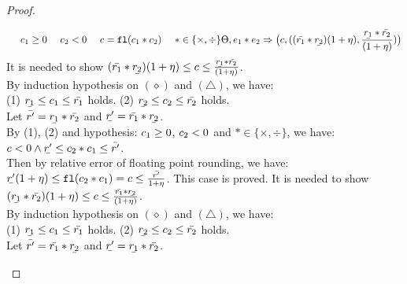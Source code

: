 \documentclass[a4paper,11pt]{article}
\begin{document}
\begin{proof}
\begin{itemize}
{\[{			~~~~
			\fval_1 \geq 0
			~~~~
			\fval_2 < 0
			~~~~
			\fval = \floaten(\fval_1 * \fval_2)
			~~~~
			* \in \{\times, \div \}
		}
		{
		    \trsenv, \expr_1 * \expr_2
		    \trsto
		    \big(
		    \fval,
		    ((\bar{\rval_1} * \ubar{\rval_2})(1 + \eta),
		    \frac{\ubar{\rval_1} * \bar{\rval_2}}{(1 + \eta)})
		    \big)
		}
	\]}
	It is needed to show 
	$(\bar{\rval_1} * \ubar{\rval_2})(1 + \eta)
	\leq \fval \leq 
	\frac{\ubar{\rval_1} * \bar{\rval_2}}{(1 + \eta)}$.\\
	By induction hypothesis on $(\diamond)$ and $(\triangle)$, we have:\\
	(1) $\ubar{\rval_1} \leq \fval_1 \leq \bar{\rval_1}$ holds. 
	(2) $\ubar{\rval_2} \leq \fval_2 \leq \bar{\rval_2}$ holds.\\
	Let $\bar{\rval'} = 
	\ubar{\rval_1} * \bar{\rval_2}$
	and 
	$\ubar{\rval'} = \bar{\rval_1} * \ubar{\rval_2}$.
	\\
	By (1), (2) and hypothesis: $c_1 \geq 0$, $c_2 < 0$ and $ * \in \{\times, \div\}$, we have:
	$\fval < 0
	\land
	\ubar{\rval'}
	\leq \fval_2 \bop \fval_1
	\leq \bar{\rval'}$.\\
	Then by relative error of floating point rounding, we have:\\
	$\ubar{\rval'}(1 + \eta)
	\leq \floaten(\fval_2 \bop \fval_1) = \fval
	\leq \frac{\bar{\rval'}}{1 + \eta}$.
	This case is proved.
	\caseL{\[
	\inferrule*[right = bop-np]
		{
			\trsenv, \expr_1 \trsto (\fval_1, (\ubar{\rval_1}, \bar{\rval_1}))
			~~~~
			\trsenv, \expr_2 \trsto (\fval_2, (\ubar{\rval_2}, \bar{\rval_2}))
			~~~~
			\fval_1 < 0
			~~~~
			\fval_2 \geq 0
			~~~~
			\fval = \floaten(\fval_1 * \fval_2)
			~~~~
			* \in \{\times, \div \}
		}
		{
		    \trsenv, \expr_1 * \expr_2
		    \trsto
		    \big(
		    \fval,
		    ((\ubar{\rval_1} * \bar{\rval_2})(1 + \eta),
		    \frac{\bar{\rval_1} * \ubar{\rval_2}}{(1 + \eta)})
		    \big)
		}
	\]}
 	It is needed to show 
	$(\ubar{\rval_1} * \bar{\rval_2})(1 + \eta)
	\leq \fval \leq 
	\frac{\bar{\rval_1} * \ubar{\rval_2}}{(1 + \eta)}$.\\
	By induction hypothesis on $(\diamond)$ and $(\triangle)$, we have:\\
	(1) $\ubar{\rval_1} \leq \fval_1 \leq \bar{\rval_1}$ holds. 
	(2) $\ubar{\rval_2} \leq \fval_2 \leq \bar{\rval_2}$ holds.\\
	Let 
	$\bar{\rval'} = \bar{\rval_1} * \ubar{\rval_2}$
	and 
	$\ubar{\rval'} = \ubar{\rval_1} * \bar{\rval_2}$.
	\\

\end{itemize}
\end{proof}
\end{document}
